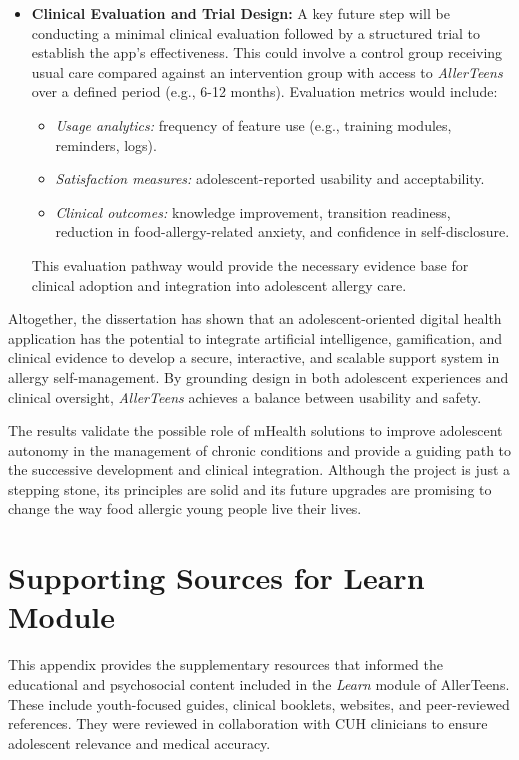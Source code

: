 \documentclass[MScCS]{uccthesis}
\begin{document}
\begin{itemize}
    \item \textbf{Clinical Evaluation and Trial Design:}  
    A key future step will be conducting a minimal clinical evaluation followed by a structured trial to establish the app's effectiveness. This could involve a control group receiving usual care compared against an intervention group with access to \textit{AllerTeens} over a defined period (e.g., 6-12 months).  
    Evaluation metrics would include:
    \begin{itemize}
        \item \textit{Usage analytics:} frequency of feature use (e.g., training modules, reminders, logs).  
        \item \textit{Satisfaction measures:} adolescent-reported usability and acceptability.  
        \item \textit{Clinical outcomes:} knowledge improvement, transition readiness, reduction in food-allergy-related anxiety, and confidence in self-disclosure.  
    \end{itemize}
    This evaluation pathway would provide the necessary evidence base for clinical adoption and integration into adolescent allergy care.
\end{itemize}  


Altogether, the dissertation has shown that an adolescent-oriented digital health application has the potential to integrate artificial intelligence, gamification, and clinical evidence to develop a secure, interactive, and scalable support system in allergy self-management. By grounding design in both adolescent experiences and clinical oversight, \textit{AllerTeens} achieves a balance between usability and safety.  

The results validate the possible role of mHealth solutions to improve adolescent autonomy in the management of chronic conditions and provide a guiding path to the successive development and clinical integration. Although the project is just a stepping stone, its principles are solid and its future upgrades are promising to change the way food allergic young people live their lives.


\appendix
\chapter{Supporting Sources for Learn Module}
\label{app:resources}

This appendix provides the supplementary resources that informed the educational and psychosocial content included in the \textit{Learn} module of AllerTeens. These include youth-focused guides, clinical booklets, websites, and peer-reviewed references. They were reviewed in collaboration with CUH clinicians to ensure adolescent relevance and medical accuracy.
\end{document}
